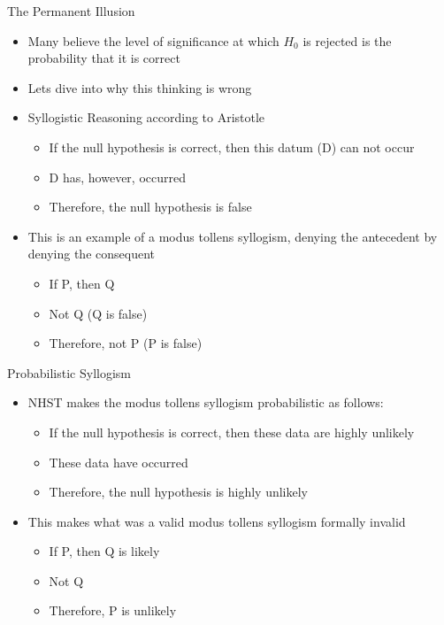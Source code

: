 \documentclass[aspectratio=169, 12pt]{beamer}
\begin{document}
\begin{frame}{The Permanent Illusion}
  \begin{itemize}
  \item Many believe the level of significance at which $H_0$ is rejected is the probability that it is correct
  \item Lets dive into why this thinking is wrong
  \item Syllogistic Reasoning according to Aristotle
	 \begin{itemize}
 	 \item If the null hypothesis is correct, then this datum (D) can not occur
	 \item D has, however, occurred
            \item Therefore, the null hypothesis is false
 	 \end{itemize}
\item This is an example of a modus tollens syllogism, denying the antecedent by denying the consequent
	 \begin{itemize}
 	 \item If P, then Q 
	 \item Not Q (Q is false)
            \item Therefore, not P (P is false)
 	 \end{itemize}
  \end{itemize}
\end{frame}

\begin{frame}{Probabilistic Syllogism}
  \begin{itemize}
  \item NHST makes the modus tollens syllogism probabilistic as follows:
    \begin{itemize}
    \item If the null hypothesis is correct, then these data are highly unlikely
    \item These data have occurred
    \item Therefore, the null hypothesis is highly unlikely
    \end{itemize}
  \item This makes what was a valid modus tollens syllogism formally invalid %
	 \begin{itemize}
 	 \item If P, then Q is likely
	 \item Not Q
            \item Therefore, P is unlikely
 	 \end{itemize}
  \end{itemize}
\end{frame}
\end{document}
